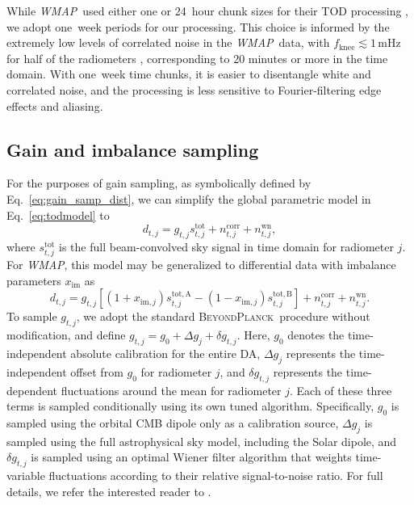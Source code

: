 \documentclass[twocolumn]{aa}
\def\WMAP{\emph{WMAP}}
\newcommand{\BP}{\textsc{BeyondPlanck}}
\begin{document}
While \WMAP\ used either one or 24~hour chunk sizes for their TOD processing
\citep{bennett2012}, we adopt one~week periods for our processing. This choice
is informed by the extremely low levels of correlated noise in the \WMAP\ data,
with $f_{\mathrm{knee}}\lesssim 1\,\mathrm{mHz}$ for half of the radiometers
\citep{jarosik2003}, corresponding to 20 minutes or more in the time domain.
With one~week time chunks, it is easier to disentangle white and correlated
noise, and the processing is less sensitive to Fourier-filtering edge effects
and aliasing.

\subsection{Gain and imbalance sampling}
\label{subsec:gainimbal}

For the purposes of gain sampling, as symbolically defined by
Eq.~\eqref{eq:gain_samp_dist}, we can simplify the global parametric
model in Eq.~\eqref{eq:todmodel} to 
\begin{equation}
	d_{t,j} = g_{t,j}^{\phantom{tot}}s_{t,j}^\mathrm{tot}+n_{t,j}^\mathrm{corr}+
	n_{t,j}^\mathrm{wn},
\end{equation}
where $s_{t,j}^\mathrm{tot}$ is the full beam-convolved sky signal in
time domain for radiometer $j$. For \WMAP, this model may be
generalized to differential data with imbalance parameters
$x_\mathrm{im}$ as
\begin{equation}
	d_{t,j} = g_{t,j}[(1+x_{\mathrm{im},j})s_{t,j}^\mathrm{tot,A}
			 - (1-x_{\mathrm{im},j})s_{t,j}^\mathrm{tot,B}]
	+n_{t,j}^\mathrm{corr}+
	n_{t,j}^\mathrm{wn}.
       \label{eq:wmap_gain}
\end{equation}
To sample $g_{t,j}$, we adopt the standard \BP\ procedure without modification,
and define $g_{t,j}=g_0+\Delta g_j+\delta g_{t,j}$. Here, $g_0$ denotes the
time-independent absolute calibration for the entire DA, $\Delta g_j$
represents the time-independent offset from $g_0$ for radiometer $j$, and
$\delta g_{t,j}$ represents the time-dependent fluctuations around the mean for
radiometer $j$. Each of these three terms is sampled conditionally using its
own tuned algorithm. Specifically, $g_0$ is sampled using the orbital CMB
dipole only as a calibration source, $\Delta g_j$ is sampled using the full
astrophysical sky model, including the Solar dipole, and $\delta g_{t,j}$ is
sampled using an optimal Wiener filter algorithm that weights time-variable
fluctuations according to their relative signal-to-noise ratio. For full
details, we refer the interested reader to \citet{bp07}.
\end{document}
